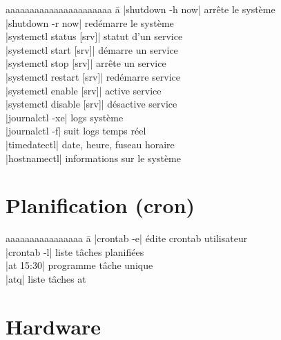 \documentclass{article}
\begin{document}
\begin{multicols}{4}
    \begin{tabbing}
        aaaaaaaaaaaaaaaaaaaaaa \= a \kill
        \code|shutdown -h now| \> arrête le système \\
        \code|shutdown -r now| \> redémarre le système \\
        \code|systemctl status [srv]| \> statut d'un service \\
        \code|systemctl start [srv]| \> démarre un service \\
        \code|systemctl stop [srv]| \> arrête un service \\
        \code|systemctl restart [srv]| \> redémarre service \\
        \code|systemctl enable [srv]| \> active service \\
        \code|systemctl disable [srv]| \> désactive service \\
        \code|journalctl -xe| \> logs système \\
        \code|journalctl -f| \> suit logs temps réel \\
        \code|timedatectl| \quad date, heure, fuseau horaire \\
        \code|hostnamectl| \quad informations sur le système
    \end{tabbing}

    \section*{Planification (cron)}
    \begin{tabbing}
        aaaaaaaaaaaaaaaa \= a \kill
        \code|crontab -e| \> édite crontab utilisateur \\
        \code|crontab -l| \> liste tâches planifiées \\
        \code|at 15:30| \> programme tâche unique \\
        \code|atq| \> liste tâches at
    \end{tabbing}

    \section*{Hardware}


\end{multicols}
\end{document}
